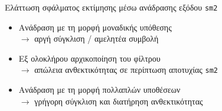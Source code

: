 \begin{frame}{Ελάττωση σφάλματος εκτίμησης μέσω ανάδρασης εξόδου \texttt{sm2}}


  \begin{itemize}
    \item<1-> Ανάδραση με τη μορφή μοναδικής υπόθεσης \\$\rightarrow$ \textcolor{r}{αργή σύγκλιση / αμελητέα συμβολή}
    \item<2-> Εξ ολοκλήρου αρχικοποίηση του φίλτρου \\$\rightarrow$ \textcolor{r}{απώλεια ανθεκτικότητας σε περίπτωση αποτυχίας \texttt{sm2}}
    \item<3-> Ανάδραση με τη μορφή πολλαπλών υποθέσεων \\$\rightarrow$ \textcolor{g}{γρήγορη σύγκλιση και διατήρηση ανθεκτικότητας}
  \end{itemize}


\end{frame}
